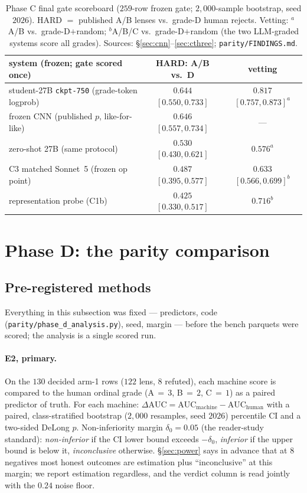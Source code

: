 \documentclass[11pt,letterpaper]{article}
\newcommand{\dauc}{\ensuremath{\Delta\mathrm{AUC}}}
\begin{document}
\begin{table}[t]
\centering\small
\begin{tabular}{lcc}
\toprule
system (frozen; gate scored once) & HARD: A/B vs.\ D & vetting \\
\midrule
student-27B \texttt{ckpt-750} (grade-token logprob) & $\mathbf{0.644}$ $[0.550,0.733]$ & $\mathbf{0.817}$ $[0.757,0.873]^{a}$ \\
frozen CNN (published $p$, like-for-like)           & $0.646$ $[0.557,0.734]$ & --- \\
zero-shot 27B (same protocol)                       & $0.530$ $[0.430,0.621]$ & $0.576^{a}$ \\
C3 matched Sonnet~5 (frozen op point)               & $0.487$ $[0.395,0.577]$ & $0.633$ $[0.566,0.699]^{b}$ \\
representation probe (C1b)                          & $0.425$ $[0.330,0.517]$ & $0.716^{b}$ \\
\bottomrule
\end{tabular}
\caption{Phase C final gate scoreboard ($259$-row frozen gate; $2{,}000$-sample
bootstrap, seed $2026$). HARD $=$ published A/B lenses vs.\ grade-D human rejects.
Vetting: $^{a}$A/B vs.\ grade-D$+$random; $^{b}$A/B/C vs.\ grade-D$+$random (the two
LLM-graded systems score all grades). Sources: \S\ref{sec:cnn}--\ref{sec:cthree};
\texttt{parity/FINDINGS.md}.}\label{tab:gate}
\end{table}

\section{Phase D: the parity comparison}\label{sec:phased}

\subsection{Pre-registered methods}\label{sec:dmethods}
Everything in this subsection was fixed --- predictors, code
(\texttt{parity/phase\_d\_analysis.py}), seed, margin --- before the bench parquets
were scored; the analysis is a single scored run.

\paragraph{E2, primary.} On the $130$ decided arm-1 rows ($122$ lens, $8$ refuted),
each machine score is compared to the human ordinal grade (A$\,{=}\,3$, B$\,{=}\,2$,
C$\,{=}\,1$) as a paired predictor of truth. For each machine:
$\dauc=\mathrm{AUC}_{\mathrm{machine}}-\mathrm{AUC}_{\mathrm{human}}$ with a paired,
class-stratified bootstrap ($2{,}000$ resamples, seed $2026$) percentile CI and a
two-sided DeLong $p$. Non-inferiority margin $\delta_0=0.05$ (the reader-study
standard): \emph{non-inferior} if the CI lower bound exceeds $-\delta_0$,
\emph{inferior} if the upper bound is below it, \emph{inconclusive} otherwise.
\S\ref{sec:power} says in advance that at $8$ negatives most honest outcomes are
estimation plus ``inconclusive'' at this margin; we report estimation regardless, and
the verdict column is read jointly with the $0.24$ noise floor.
\end{document}
